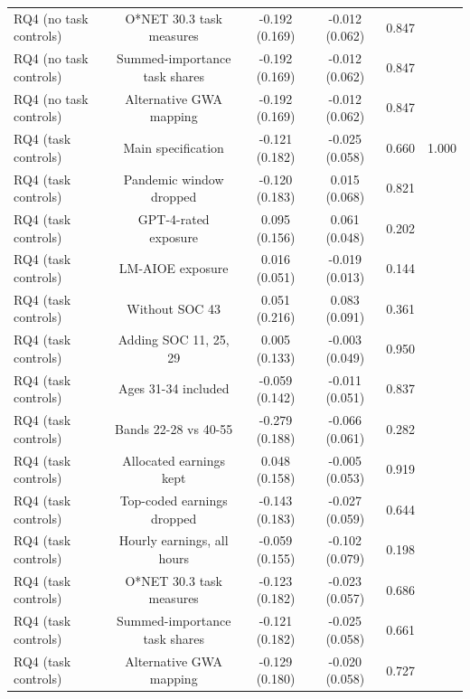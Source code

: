 \begin{table}[htbp]
\begin{tabular}{lccccc}
RQ4 (no task controls) & O*NET 30.3 task measures & -0.192 (0.169) & -0.012 (0.062) & 0.847 &  \\
RQ4 (no task controls) & Summed-importance task shares & -0.192 (0.169) & -0.012 (0.062) & 0.847 &  \\
RQ4 (no task controls) & Alternative GWA mapping & -0.192 (0.169) & -0.012 (0.062) & 0.847 &  \\
RQ4 (task controls) & Main specification & -0.121 (0.182) & -0.025 (0.058) & 0.660 & 1.000 \\
RQ4 (task controls) & Pandemic window dropped & -0.120 (0.183) & 0.015 (0.068) & 0.821 &  \\
RQ4 (task controls) & GPT-4-rated exposure & 0.095 (0.156) & 0.061 (0.048) & 0.202 &  \\
RQ4 (task controls) & LM-AIOE exposure & 0.016 (0.051) & -0.019 (0.013) & 0.144 &  \\
RQ4 (task controls) & Without SOC 43 & 0.051 (0.216) & 0.083 (0.091) & 0.361 &  \\
RQ4 (task controls) & Adding SOC 11, 25, 29 & 0.005 (0.133) & -0.003 (0.049) & 0.950 &  \\
RQ4 (task controls) & Ages 31-34 included & -0.059 (0.142) & -0.011 (0.051) & 0.837 &  \\
RQ4 (task controls) & Bands 22-28 vs 40-55 & -0.279 (0.188) & -0.066 (0.061) & 0.282 &  \\
RQ4 (task controls) & Allocated earnings kept & 0.048 (0.158) & -0.005 (0.053) & 0.919 &  \\
RQ4 (task controls) & Top-coded earnings dropped & -0.143 (0.183) & -0.027 (0.059) & 0.644 &  \\
RQ4 (task controls) & Hourly earnings, all hours & -0.059 (0.155) & -0.102 (0.079) & 0.198 &  \\
RQ4 (task controls) & O*NET 30.3 task measures & -0.123 (0.182) & -0.023 (0.057) & 0.686 &  \\
RQ4 (task controls) & Summed-importance task shares & -0.121 (0.182) & -0.025 (0.058) & 0.661 &  \\
RQ4 (task controls) & Alternative GWA mapping & -0.129 (0.180) & -0.020 (0.058) & 0.727 &  \\
\bottomrule
\end{tabular}
\par\vspace{2pt}{\footnotesize Post average = mean of the post-period coefficients (relative to the reference quarter 2022Q3 only). Post minus pre = mean post coefficient minus mean pre coefficient, which does not depend on the choice of reference quarter. Clustered standard errors in parentheses from the saved covariance matrices; p-values from the normal distribution. Holm p adjusts the four main-specification post-minus-pre contrasts for multiple testing. Model 2 has no pre-period coefficients. * p<0.10, ** p<0.05, *** p<0.01.}
\end{table}
